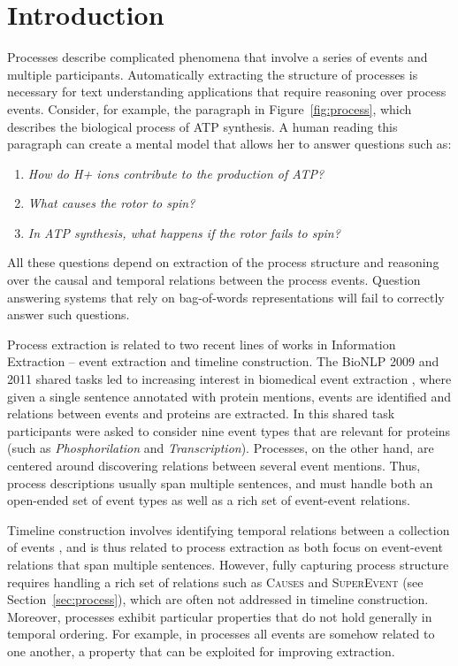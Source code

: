 \section{Introduction}

Processes describe complicated phenomena that involve a series of events and multiple participants. Automatically extracting the structure of processes is necessary for text understanding applications that require reasoning over process events. Consider, for example, the paragraph in Figure~\ref{fig:process}, which describes the biological process of ATP synthesis. A human reading this paragraph can create a mental model that allows her to answer questions such as:

\begin{enumerate}[itemsep=0pt,topsep=0pt] 
\item \small \emph{How do H+ ions contribute to the production of ATP?}
\item \small\emph{What causes the rotor to spin?}
\item \small \emph{In ATP synthesis, what happens if the rotor fails to spin?}
\end{enumerate}

\noindent All these questions depend on extraction of the process structure and reasoning over the causal and temporal relations between the process events. Question answering systems that rely on bag-of-words representations will fail to correctly answer such questions.


Process extraction is related to two recent lines of works in Information Extraction -- event extraction and timeline construction. The BioNLP 2009 and 2011 shared tasks \cite{kim09,kim11} led to increasing interest in biomedical event extraction \cite{Poon10,Miwa10,riedel11fast,Mcclosky11,Bjorne11}, where given a single sentence annotated with protein mentions, events  are identified and relations between events and proteins are extracted. In this shared task participants were asked to consider nine event types that are relevant for proteins (such as \emph{Phosphorilation} and \emph{Transcription}). Processes, on the other hand,  are centered around discovering relations between several event mentions. Thus, process descriptions usually span multiple sentences, and must handle both an open-ended set of event types as well as a rich set of event-event relations.

Timeline construction involves identifying temporal relations between a collection of events \cite{Chambers08,Yoshikawa09,Denis11,Do12,Mcclosky12}, and is thus related to process extraction as both focus on event-event relations that span multiple sentences. However, fully capturing process structure requires handling a rich set of relations such as \textsc{Causes} and \textsc{SuperEvent} (see Section~\ref{sec:process}), which are often not addressed in timeline construction. Moreover, processes exhibit particular properties that do not hold generally in temporal ordering. For example, in processes all events are somehow related to one another, a property that can be exploited for improving extraction.

